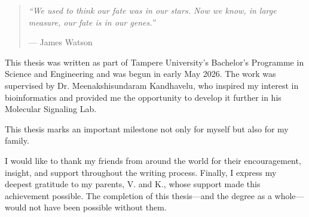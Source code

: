 \begin{quote}
\textit{“We used to think our fate was in our stars. Now we know, in large measure, our fate is in our genes.”}

\par\hfill — James Watson
\end{quote}

This thesis was written as part of Tampere University’s Bachelor’s Programme in Science and Engineering and was begun in early May 2026. The work was supervised by Dr. Meenakshisundaram Kandhavelu, who inspired my interest in bioinformatics and provided me the opportunity to develop it further in his Molecular Signaling Lab.

This thesis marks an important milestone not only for myself but also for my family.

I would like to thank my friends from around the world for their encouragement, insight, and support throughout the writing process. Finally, I express my deepest gratitude to my parents, V. and K., whose support made this achievement possible. The completion of this thesis—and the degree as a whole—would not have been possible without them.

